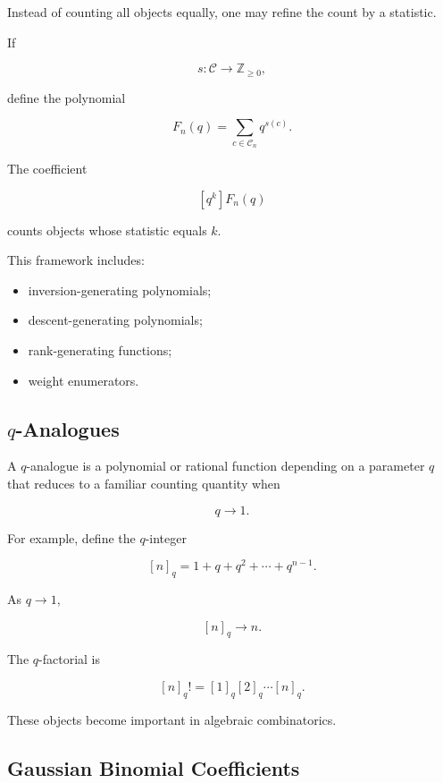 Instead of counting all objects equally, one may refine the count by a
statistic.

If

\[
s:\mathcal{C}\to\mathbb{Z}_{\geq0},
\]

define the polynomial

\[
\boxed{
F_n(q)
=
\sum_{c\in\mathcal{C}_n}
q^{s(c)}.
}
\]

The coefficient

\[
[q^k]F_n(q)
\]

counts objects whose statistic equals \(k\).

This framework includes:

\begin{itemize}
    \item inversion-generating polynomials;
    \item descent-generating polynomials;
    \item rank-generating functions;
    \item weight enumerators.
\end{itemize}

\subsection{\(q\)-Analogues}
\label{subsec:q-analogues}

A \(q\)-analogue is a polynomial or rational function depending on a
parameter \(q\) that reduces to a familiar counting quantity when

\[
q\to1.
\]

For example, define the \(q\)-integer

\[
\boxed{
[n]_q
=
1+q+q^2+\cdots+q^{n-1}.
}
\]

As \(q\to1\),

\[
[n]_q\to n.
\]

The \(q\)-factorial is

\[
\boxed{
[n]_q!
=
[1]_q[2]_q\cdots[n]_q.
}
\]

These objects become important in algebraic combinatorics.

\subsection{Gaussian Binomial Coefficients}
\label{subsec:gaussian-binomial-preview}

